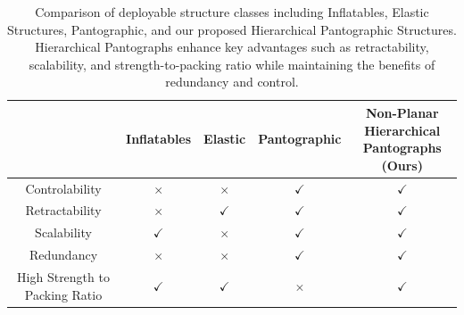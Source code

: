 \begin{table}[ht]
    \centering
    \begin{tabular}{|c|c|c|c|c|} \hline
        & Inflatables & Elastic & Pantographic & \parbox[c]{3.5cm}{\centering \textbf{Non-Planar Hierarchical}\\ \textbf{Pantographs (Ours)}} \\ \hline
        Controlability & $\times$ & $\times$ & $\checkmark$ & $\boldsymbol\checkmark$ \\ \hline
        Retractability & $\times$ & $\checkmark$ & $\checkmark$ & $\boldsymbol\checkmark$ \\ \hline
        Scalability & $\checkmark$ & $\times$ & $\checkmark$ & $\boldsymbol\checkmark$ \\ \hline
        Redundancy & $\times$ & $\times$ & $\checkmark$ & $\boldsymbol\checkmark$ \\ \hline
        High Strength to Packing Ratio & $\checkmark$ & $\checkmark$ & $\times$ & $\boldsymbol\checkmark$ \\ \hline
    \end{tabular}
    
    \caption{{Comparison of deployable structure classes including Inflatables, Elastic Structures, Pantographic, and our proposed Hierarchical Pantographic Structures. Hierarchical Pantographs enhance key advantages such as retractability, scalability, and strength-to-packing ratio while maintaining the benefits of redundancy and control.}}
    \label{tab:structure_comparison}
\end{table}

